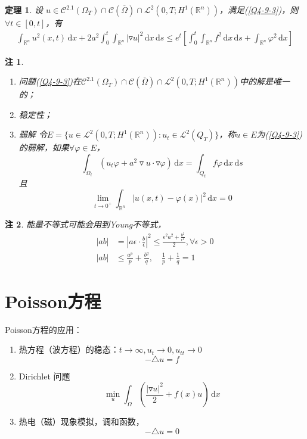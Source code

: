 \documentclass[11pt, a4paper]{article}
\theoremstyle{theorem}
\newtheorem{thm}{定理}[section]
\newtheorem*{note}{注}
\newcommand{\intd}[1]{\,\mathrm{d}{#1}}
\begin{document}
\begin{thm}
  设 $u \in \mathcal{C}^{2.1}(\Omega_T) \cap \mathcal{C}(\overline{\Omega}) \cap \mathcal{L}^2(0,T; H^1(\mathbb{R}^n))$，满足(\ref{Q4-9-3})，则$\forall t \in [0,t]$，有
  \begin{align}
      \int_{\mathbb{R}^n} u^2(x,t) \intd x + 2 a^2 \int_0^t \int_{\mathbb{R}^n} |\triangledown u|^2 \intd x \intd s \leq e^t \left[\int_0^t \int_{\mathbb{R}^n}f^2 \intd x \intd s + \int_{\mathbb{R}^n}\varphi^2 \intd x \right]
  \end{align}
\end{thm}

\begin{note}
    \begin{enumerate}
      \item 问题(\ref{Q4-9-3})在$\mathcal{C}^{2.1}(\Omega_T) \cap \mathcal{C}(\overline{\Omega}) \cap \mathcal{L}^2(0,T; H^1(\mathbb{R}^n))$中的解是唯一的；
      \item 稳定性；
      \item 弱解
      令$E = \{u \in \mathcal{L}^2(0,T; H^1(\mathbb{R}^n)): u_t \in \mathcal{L}^2(Q_T)\}$，称$u \in E$为(\ref{Q4-9-3})的弱解，如果$\forall \varphi \in E$，
      $$
      \int_{\Omega_t} \left(u_t \varphi + a^2 \triangledown u \cdot \triangledown \varphi\right) \intd x = \int_{Q_t} f \varphi \intd x \intd s
      $$
      且
      $$
      \lim_{t \rightarrow 0^+} \int_{\mathbb{R}^n} |u(x,t) - \varphi(x)|^2 \intd x = 0
      $$
    \end{enumerate}
\end{note}

\begin{note}
  能量不等式可能会用到Young不等式，
  \begin{align*}
  |ab| &= |a \epsilon \cdot \frac{b}{\epsilon}|^2 \leq \frac{\epsilon^2 a^2 + \frac{b^2}{\epsilon^2}}{2}, \forall \epsilon > 0 \\
  |ab| &\leq \frac{a^p}{p} + \frac{b^q}{q}, \quad \frac{1}{p} + \frac{1}{q} = 1
  \end{align*}
\end{note}

\newpage

\section{Poisson方程}

Poisson方程的应用：
\begin{enumerate}[(1)]
  \item 热方程（波方程）的稳态：$t \rightarrow \infty, u_t \rightarrow 0, u_{tt} \rightarrow 0$
  $$
  - \triangle u = f
  $$
  \item Dirichlet 问题
  $$
  \min_{u} \int_\Omega \left(\frac{|\triangledown u|^2}{2} + f(x) u\right) \intd x
  $$
  \item 热电（磁）现象模拟，调和函数，
  $$
  - \triangle u = 0
  $$
\end{enumerate}
\end{document}
